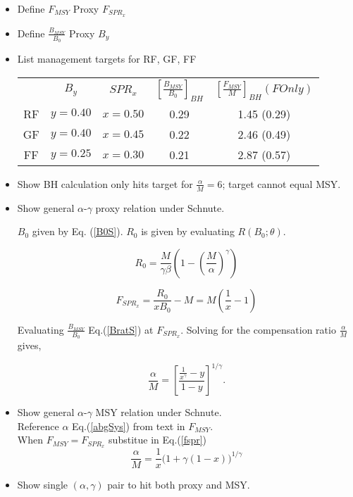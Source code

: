 \begin{itemize}
\item Define $F_{MSY}$ Proxy $F_{SPR_x}$
\item Define $\frac{B_{MSY}}{B_0}$ Proxy $B_y$
\item List management targets for RF, GF, FF
\begin{tabular}{c|c|c|c|c}
   & $B_y$ & $SPR_x$ & $\left[\frac{B_{MSY}}{B_0}\right]_{BH}$ & $\left[\frac{F_{MSY}}{M}\right]_{BH} (F Only)$ \\ 
RF & $y=0.40$ & $x=0.50$ & 0.29 & 1.45 (0.29)\\
GF & $y=0.40$ & $x=0.45$ & 0.22 & 2.46 (0.49)\\
FF & $y=0.25$ & $x=0.30$ & 0.21 & 2.87 (0.57)
\end{tabular}
\item Show BH calculation only hits target for $\frac{\alpha}{M}=6$; target cannot equal MSY.
\item Show general $\alpha$-$\gamma$ proxy relation under Schnute.

%
$B_0$ given by Eq. (\ref{B0S}). $R_0$ is given by evaluating $R(B_0; \theta)$.

%
\begin{equation}
R_0 = \frac{M}{\gamma\beta} \left(1-\left(\frac{M}{\alpha}\right)^\gamma\right)
\end{equation}

%
\begin{equation}
F_{SPR_x} = \frac{R_0}{x B_0}-M = M\left(\frac{1}{x}-1\right)\label{fspr}
\end{equation}

%
Evaluating $\frac{B_{MSY}}{B_0}$ Eq.(\ref{BratS}) at $F_{SPR_x}$. Solving for the compensation ratio $\frac{\alpha}{M}$ gives,

%
\begin{equation}
\frac{\alpha}{M} = \left[ \frac{\frac{1}{x^\gamma}-y}{1-y} \right]^{1/\gamma}. \label{aProxy} %
\end{equation}

\item Show general $\alpha$-$\gamma$ MSY relation under Schnute.\\
Reference $\alpha$ Eq.(\ref{abgSys}) from text in $F_{MSY}$.\\
When $F_{MSY}=F_{SPR_x}$ substitue in Eq.(\ref{fspr})
\begin{equation}
\frac{\alpha}{M} = \frac{1}{x}\Big(1+\gamma(1-x)\Big)^{1/\gamma} \label{aMSY}
\end{equation}
\item Show single $(\alpha, \gamma)$ pair to hit both proxy and MSY.


\end{itemize}
